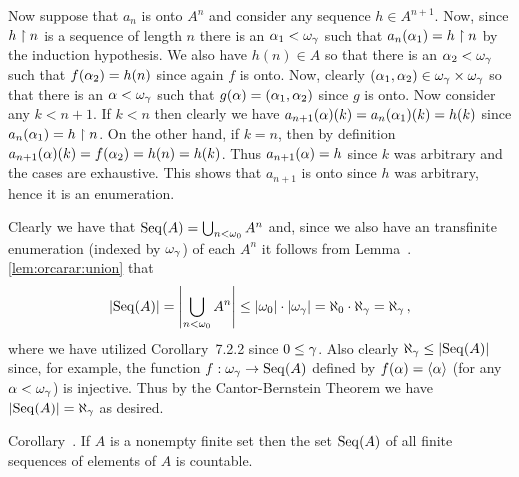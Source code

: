 \begin{solution}
{        Now suppose that $a_n$ is onto $A^n$ and consider any sequence $h \in A^{n+1}$.
        Now, since $h \restriction n$ is a sequence of length $n$ there is an $\alpha_1 < \omega_\gamma$ such that $a_n(\alpha_1) = h \restriction n$ by the induction hypothesis.
        We also have $h(n) \in A$ so that there is an $\alpha_2 < \omega_\gamma$ such that $f(\alpha_2) = h(n)$ since again $f$ is onto.
        Now, clearly $(\alpha_1, \alpha_2) \in \omega_\gamma \times \omega_\gamma$ so that there is an $\alpha < \omega_\gamma$ such that $g(\alpha) = (\alpha_1, \alpha_2)$ since $g$ is onto.
        Now consider any $k < n+1$.
        If $k < n$ then clearly we have $a_{n+1}(\alpha)(k) = a_n(\alpha_1)(k) = h(k)$ since $a_n(\alpha_1) = h \restriction n$.
        On the other hand, if $k = n$, then by definition $a_{n+1}(\alpha)(k) = f(\alpha_2) = h(n) = h(k)$.
        Thus $a_{n+1}(\alpha) = h$ since $k$ was arbitrary and the cases are exhaustive.
        This shows that $a_{n+1}$ is onto since $h$ was arbitrary, hence it is an enumeration.

        Clearly we have that $\mathrm{Seq}(A) = \bigcup_{n < \omega_0} A^n$ and, since we also have an transfinite enumeration (indexed by $\omega_\gamma$) of each $A^n$ it follows from Lemma~\ex.\ref{lem:orcarar:union} that
        $$
        \left| \mathrm{Seq}(A) \right| = \left| \bigcup_{n < \omega_0} A^n \right| \leq \left| \omega_0 \right| \cdot \left| \omega_\gamma \right| = \aleph_0 \cdot \aleph_\gamma = \aleph_\gamma \,,
        $$
        where we have utilized Corollary~7.2.2 since $0 \leq \gamma$.
        Also clearly $\aleph_\gamma \leq \left| \mathrm{Seq}(A) \right|$ since, for example, the function $f: \omega_\gamma \to \mathrm{Seq}(A)$ defined by $f(\alpha) = \left\langle \alpha \right\rangle$ (for any $\alpha < \omega_\gamma$) is injective.
        Thus by the Cantor-Bernstein Theorem we have $\left| \mathrm{Seq}(A) \right| = \aleph_\gamma$ as desired. \qedsymbol
     }

     \begin{statement}{Corollary~\ex.}
        If $A$ is a nonempty finite set then the set $\mathrm{Seq}(A)$ of all finite sequences of elements of $A$ is countable.
     \end{statement}


\end{solution}
